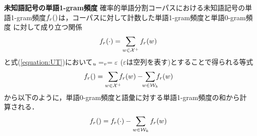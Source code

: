 \begin{list}{}{}
\item[\textbf{未知語記号の単語1-gram頻度}] 確率的単語分割コーパスにおける未知語記号の単
  語1-gram頻度$f_{r}(\UW)$は，コーパスに対して計数した単語1-gram頻度と単語0-gram頻度
  に対して成り立つ関係
  \begin{displaymath}
    f_{r}(\cdot) = \sum_{w \in {\cal X}^{+}} f_{r}(w)
  \end{displaymath}
  と式(\ref{equation:UT})において$\Bdma{w}_{u} = \Bdma{w}_{v} = \varepsilon$
  ($\varepsilon$は空列を表す)とすることで得られる等式
  \begin{displaymath}
    f_{r}(\UW) = \sum_{w \in {\cal X}^{+}} \!\!\! f_{r}(w)
    - \!\! \sum_{w \in {\cal W}_{k}} \!\!\! f_{r}(w)
  \end{displaymath}
  から以下のように，単語0-gram頻度と語彙に対する単語1-gram頻度の和から計算される．
  \begin{displaymath}
    f_{r}(\UW) = f_{r}(\cdot) - \sum_{w \in {\cal W}_{k}}f_{r}(w)
  \end{displaymath}


\end{list}
